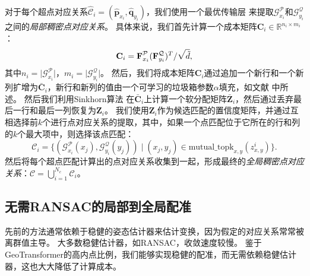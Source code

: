 对于每个超点对应关系$\hat{\mathcal{C}}_i = (\hat{\textbf{p}}_{x_i}, \hat{\textbf{q}}_{y_i})$，我们使用一个最优传输层 \cite{sarlin2020superglue} 来提取$\mathcal{G}^{\mathcal{P}}_{x_i}$和$\mathcal{G}^{\mathcal{Q}}_{y_i}$之间的\emph{局部稠密点对应关系}。
具体来说，我们首先计算一个成本矩阵$\textbf{C}_i \in \mathbb{R}^{n_i \times m_i}$：
\vspace{-2pt}
\begin{equation}
\textbf{C}_i = \textbf{F}^{\mathcal{P}}_{x_i} (\textbf{F}^{\mathcal{Q}}_{y_i})^T / \sqrt{\tilde{d}},
\vspace{-2pt}
\end{equation}
其中$n_i = \lvert \mathcal{G}^{\mathcal{P}}_{x_i} \rvert$，$m_i = \lvert \mathcal{G}^{\mathcal{Q}}_{y_i} \rvert$。
然后，我们将成本矩阵$\textbf{C}_i$通过追加一个新行和一个新列扩增为$\bar{\textbf{C}}_i$，新行和新列的值由一个可学习的垃圾箱参数$\alpha$填充，如文献 \cite{sarlin2020superglue} 中所述。
然后我们利用Sinkhorn算法 \cite{sinkhorn1967concerning} 在$\bar{\textbf{C}}_i$上计算一个软分配矩阵$\bar{\textbf{Z}}_i$，然后通过丢弃最后一行和最后一列恢复为$\textbf{Z}_i$。
我们使用$\textbf{Z}_i$作为候选匹配的置信度矩阵，并通过互相选择前$k$个进行点对应关系的提取，其中，如果一个点匹配位于它所在的行和列的$k$个最大项中，则选择该点匹配：
\vspace{-2pt}
\begin{equation}
\mathcal{C}_i = \{(\mathcal{G}^{\mathcal{P}}_{x_i}(x_j), \mathcal{G}^{\mathcal{Q}}_{y_i}(y_j)) \mid (x_j, y_j) \in \mathrm{mutual\_topk}_{x, y}(z^i_{x, y})\}.
\end{equation}
然后将每个超点匹配计算出的点对应关系收集到一起，形成最终的\emph{全局稠密点对应关系}：$\mathcal{C} = \bigcup_{i=1}^{N_c} \mathcal{C}_i$。

\subsection{无需RANSAC的局部到全局配准}
\label{sec:model-estimation}

先前的方法通常依赖于稳健的姿态估计器来估计变换，因为假定的对应关系常常被离群值主导。
大多数稳健估计器，如RANSAC，收敛速度较慢。
鉴于GeoTransformer的高内点比例，我们能够实现稳健的配准，而无需依赖稳健估计器，这也大大降低了计算成本。

